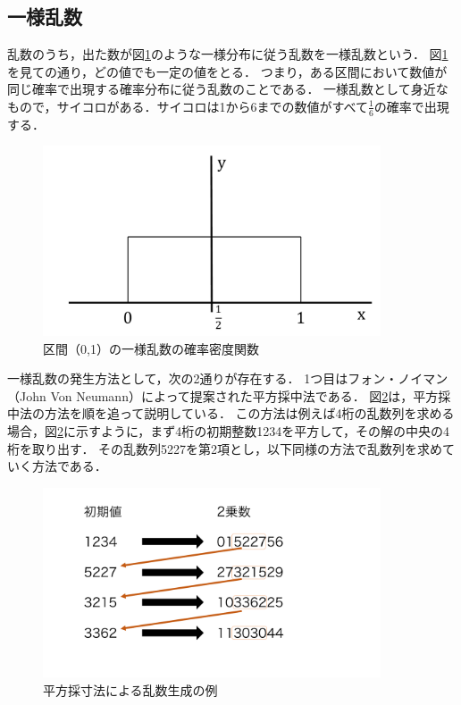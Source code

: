 \documentclass[12pt,a4j]{ltjsarticle}
\begin{document}
\subsection{一様乱数}
乱数のうち，出た数が図\ref{fig:一様乱数のグラフ}のような一様分布に従う乱数を一様乱数という．
図\ref{fig:一様乱数のグラフ}を見ての通り，どの値でも一定の値をとる．
つまり，ある区間において数値が同じ確率で出現する確率分布に従う乱数のことである．
一様乱数として身近なもので，サイコロがある．サイコロは1から6までの数値がすべて$\frac{1}{6}$の確率で出現する．
\vspace{10mm}
\begin{figure}[h]
\begin{center}
\includegraphics[width = 100mm ] {figures/itiyo.pdf}
\caption{区間（0,1）の一様乱数の確率密度関数}
\label{fig:一様乱数のグラフ}
\end{center}
\end{figure}
\clearpage

一様乱数の発生方法として，次の2通りが存在する．
1つ目はフォン・ノイマン（John Von Neumann）によって提案された平方採中法である．
図\ref{fig:平方}は，平方採中法の方法を順を追って説明している．
この方法は例えば4桁の乱数列を求める場合，図\ref{fig:平方}に示すように，まず4桁の初期整数1234を平方して，その解の中央の4桁を取り出す．
その乱数列5227を第2項とし，以下同様の方法で乱数列を求めていく方法である．
\begin{figure}[h]
\begin{center}
\includegraphics[width = 100mm ] {figures/heihousaisunhou.pdf}
\caption{平方採寸法による乱数生成の例} 
\label{fig:平方}
\end{center}
\end{figure}
\end{document}
